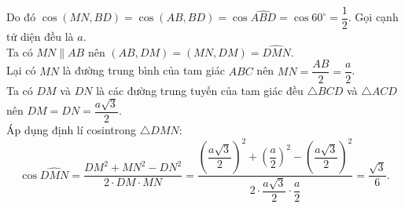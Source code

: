 \begin{ex}
{\begin{itemchoice}
			Do đó $\cos  (MN,BD)=\cos (AB,BD)=\cos \widehat{ABD}=\cos 60^\circ=\dfrac{1}{2}$.
			 \itemch
			Gọi cạnh tứ diện  đều là $a$.\\
			Ta có $MN  \parallel AB$ nên $(AB,DM)=(MN,DM)=\widehat{DMN}$.\\
			Lại có $MN$ là  đường trung bình của tam giác $ABC$ nên $MN=\dfrac{AB}{2}=\dfrac{a}{2}$.\\
			Ta có $DM$ và $DN$ là các đường trung tuyến của tam giác đều $\triangle BCD$ và $\triangle  ACD$ nên $DM=DN=\dfrac{a\sqrt{3}}{2}$.\\
			Áp  dụng định lí cosintrong $\triangle DMN$:
			\[\cos \widehat{DMN}=\dfrac{DM^2+MN^2-DN^2}{2 \cdot DM \cdot MN}=\dfrac{\left(\dfrac{a\sqrt{3}}{2}\right)^2+\left(\dfrac{a}{2}\right)^2-\left(\dfrac{a\sqrt{3}}{2}\right)^2}{2  \cdot \dfrac{a\sqrt{3}}{2} \cdot \dfrac{a}{2}}=\dfrac{\sqrt{3}}{6}.\]
		\end{itemchoice}
	 }
\end{ex}

